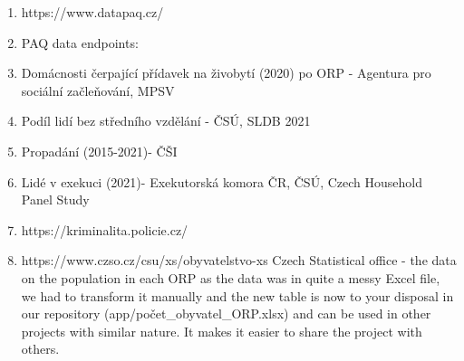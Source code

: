 \documentclass[a4paper, 12pt]{article}
\begin{document}
\begin{enumerate}
\item https://www.datapaq.cz/
\item PAQ data endpoints:
\item Domácnosti čerpající přídavek na živobytí (2020) po ORP - Agentura pro sociální začleňování, MPSV
\item Podíl lidí bez středního vzdělání - ČSÚ, SLDB 2021
\item Propadání (2015-2021)- ČŠI
\item Lidé v exekuci (2021)- Exekutorská komora ČR, ČSÚ, Czech Household Panel Study
\item https://kriminalita.policie.cz/
\item https://www.czso.cz/csu/xs/obyvatelstvo-xs Czech Statistical office - the data on the population in each ORP as the data was in quite a messy Excel file, we had to transform it manually and the new table is now to your disposal in our repository (app/počet\_obyvatel\_ORP.xlsx) and can be used in other projects with similar nature. It makes it easier to share the project with others.
\end{enumerate}


	
\end{document}
